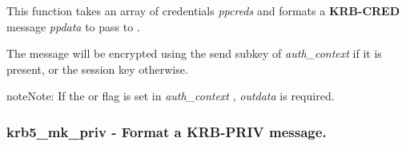 \documentclass[letterpaper,10pt,english]{sphinxmanual}
\begin{document}
This function takes an array of credentials \emph{ppcreds} and formats a \textbf{KRB-CRED} message \emph{ppdata} to pass to {\hyperref[appdev/refs/api/krb5_rd_cred:krb5_rd_cred]{}} .

The message will be encrypted using the send subkey of \emph{auth\_context} if it is present, or the session key otherwise.

\begin{notice}{note}{Note:}
If the {\hyperref[appdev/refs/macros/KRB5_AUTH_CONTEXT_RET_TIME:KRB5_AUTH_CONTEXT_RET_TIME]{}} or {\hyperref[appdev/refs/macros/KRB5_AUTH_CONTEXT_RET_SEQUENCE:KRB5_AUTH_CONTEXT_RET_SEQUENCE]{}} flag is set in \emph{auth\_context} , \emph{outdata} is required.
\end{notice}


\subsubsection{krb5\_mk\_priv -  Format a KRB-PRIV message.}
\label{appdev/refs/api/krb5_mk_priv:krb5-mk-priv-format-a-krb-priv-message}\label{appdev/refs/api/krb5_mk_priv::doc}

\begin{fulllineitems}
\label{appdev/refs/api/krb5_mk_priv:krb5_mk_priv}
\end{fulllineitems}
\end{document}
